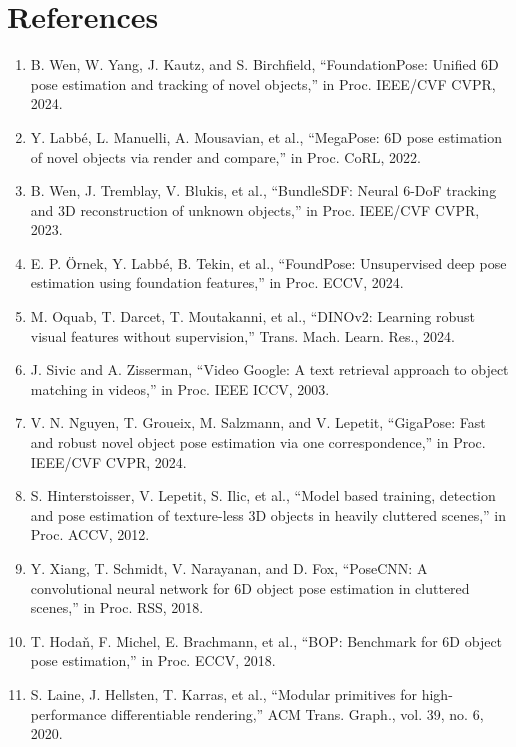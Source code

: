\documentclass[10pt,twocolumn,letterpaper]{article}
\begin{document}
\section*{References}
\begin{enumerate}\small\itemsep1pt\parskip0pt
\item B. Wen, W. Yang, J. Kautz, and S. Birchfield, ``FoundationPose: Unified 6D pose estimation and tracking of novel objects,'' in Proc. IEEE/CVF CVPR, 2024.
\item Y. Labbé, L. Manuelli, A. Mousavian, et al., ``MegaPose: 6D pose estimation of novel objects via render and compare,'' in Proc. CoRL, 2022.
\item B. Wen, J. Tremblay, V. Blukis, et al., ``BundleSDF: Neural 6-DoF tracking and 3D reconstruction of unknown objects,'' in Proc. IEEE/CVF CVPR, 2023.
\item E. P. Örnek, Y. Labbé, B. Tekin, et al., ``FoundPose: Unsupervised deep pose estimation using foundation features,'' in Proc. ECCV, 2024.
\item M. Oquab, T. Darcet, T. Moutakanni, et al., ``DINOv2: Learning robust visual features without supervision,'' Trans. Mach. Learn. Res., 2024.
\item J. Sivic and A. Zisserman, ``Video Google: A text retrieval approach to object matching in videos,'' in Proc. IEEE ICCV, 2003.
\item V. N. Nguyen, T. Groueix, M. Salzmann, and V. Lepetit, ``GigaPose: Fast and robust novel object pose estimation via one correspondence,'' in Proc. IEEE/CVF CVPR, 2024.
\item S. Hinterstoisser, V. Lepetit, S. Ilic, et al., ``Model based training, detection and pose estimation of texture-less 3D objects in heavily cluttered scenes,'' in Proc. ACCV, 2012.
\item Y. Xiang, T. Schmidt, V. Narayanan, and D. Fox, ``PoseCNN: A convolutional neural network for 6D object pose estimation in cluttered scenes,'' in Proc. RSS, 2018.
\item T. Hodaň, F. Michel, E. Brachmann, et al., ``BOP: Benchmark for 6D object pose estimation,'' in Proc. ECCV, 2018.
\item S. Laine, J. Hellsten, T. Karras, et al., ``Modular primitives for high-performance differentiable rendering,'' ACM Trans. Graph., vol. 39, no. 6, 2020.
\end{enumerate}
\end{document}
